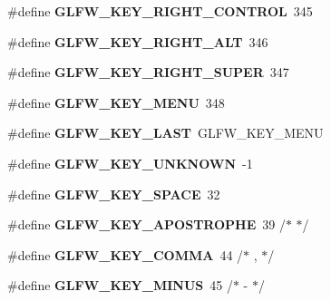 \begin{DoxyCompactItemize}
\item 
\mbox{\label{group__keys_gad1ca2094b2694e7251d0ab1fd34f8519}} 
\#define {\bfseries G\+L\+F\+W\+\_\+\+K\+E\+Y\+\_\+\+R\+I\+G\+H\+T\+\_\+\+C\+O\+N\+T\+R\+OL}~345
\item 
\mbox{\label{group__keys_ga687b38009131cfdd07a8d05fff8fa446}} 
\#define {\bfseries G\+L\+F\+W\+\_\+\+K\+E\+Y\+\_\+\+R\+I\+G\+H\+T\+\_\+\+A\+LT}~346
\item 
\mbox{\label{group__keys_gad4547a3e8e247594acb60423fe6502db}} 
\#define {\bfseries G\+L\+F\+W\+\_\+\+K\+E\+Y\+\_\+\+R\+I\+G\+H\+T\+\_\+\+S\+U\+P\+ER}~347
\item 
\mbox{\label{group__keys_ga9845be48a745fc232045c9ec174d8820}} 
\#define {\bfseries G\+L\+F\+W\+\_\+\+K\+E\+Y\+\_\+\+M\+E\+NU}~348
\item 
\mbox{\label{group__keys_ga442cbaef7bfb9a4ba13594dd7fbf2789}} 
\#define {\bfseries G\+L\+F\+W\+\_\+\+K\+E\+Y\+\_\+\+L\+A\+ST}~G\+L\+F\+W\+\_\+\+K\+E\+Y\+\_\+\+M\+E\+NU
\item 
\mbox{\label{group__keys_ga99aacc875b6b27a072552631e13775c7}} 
\#define {\bfseries G\+L\+F\+W\+\_\+\+K\+E\+Y\+\_\+\+U\+N\+K\+N\+O\+WN}~-\/1
\item 
\mbox{\label{group__keys_gaddb2c23772b97fd7e26e8ee66f1ad014}} 
\#define {\bfseries G\+L\+F\+W\+\_\+\+K\+E\+Y\+\_\+\+S\+P\+A\+CE}~32
\item 
\mbox{\label{group__keys_ga6059b0b048ba6980b6107fffbd3b4b24}} 
\#define {\bfseries G\+L\+F\+W\+\_\+\+K\+E\+Y\+\_\+\+A\+P\+O\+S\+T\+R\+O\+P\+HE}~39  /$\ast$ \textquotesingle{} $\ast$/
\item 
\mbox{\label{group__keys_gab3d5d72e59d3055f494627b0a524926c}} 
\#define {\bfseries G\+L\+F\+W\+\_\+\+K\+E\+Y\+\_\+\+C\+O\+M\+MA}~44  /$\ast$ , $\ast$/
\item 
\mbox{\label{group__keys_gac556b360f7f6fca4b70ba0aecf313fd4}} 
\#define {\bfseries G\+L\+F\+W\+\_\+\+K\+E\+Y\+\_\+\+M\+I\+N\+US}~45  /$\ast$ -\/ $\ast$/
\item 

\end{DoxyCompactItemize}
